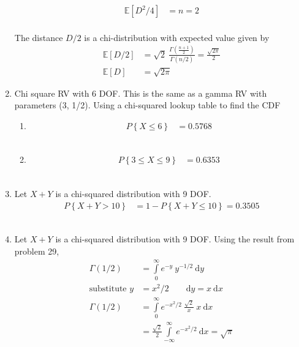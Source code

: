 \begin{enumerate}
		\begin{align}
			\mathbb{E}[D^2 / 4] &= n = 2 \nonumber
		\end{align}\\
		The distance $ D/2 $ is a chi-distribution with expected value given by \\
		
		\begin{align}
			\mathbb{E}[D/2] &= \sqrt{2} \ \frac{\Gamma\left(\frac{n+1}{2}\right)}{\Gamma(n/2)} = \frac{\sqrt{2 \pi}}{2} \nonumber \\
			\mathbb{E}[D] &= \sqrt{2 \pi}
		\end{align}
	
	
	\item Chi square RV with 6 DOF. This is the same as a gamma RV with parameters (3, 1/2).  Using a chi-squared lookup table to find the CDF\\
			
		\begin{enumerate}
			\item
			\begin{align}
				P \left\{X \leq 6\right\} &= 0.5768
			\end{align}\\
			
			\item
			\begin{align}
				P \left\{3 \leq X \leq 9\right\} &= 0.6353
			\end{align}\\
			
		\end{enumerate}
	
	
	\item Let $ X + Y $ is a chi-squared distribution with 9 DOF.\\
			
		\begin{align}
			P \left\{X + Y > 10\right\} &= 1 - P \left\{X + Y \leq 10\right\} = 0.3505
		\end{align}\\
	
	
	\item Let $ X + Y $ is a chi-squared distribution with 9 DOF. Using the result from problem 29,\\
			
		\begin{align}
			\Gamma(1/2) &= \int\limits_{0}^{\infty} e^{-y}\ y^{-1/2}\ \mathrm{d}y \\
			\text{substitute }y &= x^2 / 2 \qquad \mathrm{d}y = x\ \mathrm{d}x \nonumber \\
			\Gamma(1/2) &= \int\limits_{0}^{\infty} e^{-x^2/2}\ \frac{\sqrt{2}}{x}\ x\ \mathrm{d}x \nonumber \\
			&= \frac{\sqrt{2}}{2} \int\limits_{-\infty}^{\infty} e^{-x^2/2}\ \mathrm{d}x = \sqrt{\pi}
		\end{align}\\
	

\end{enumerate}
